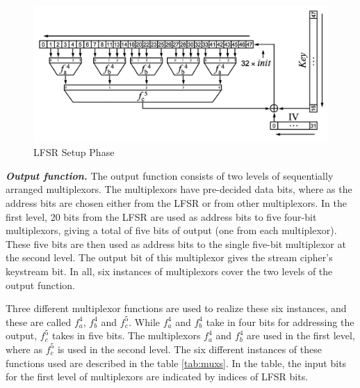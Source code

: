 
\begin{figure}[ht!]
	\centering
		\includegraphics[width=5in]{./figures/hitag2-2.PNG}
	\caption{LFSR Setup Phase}	
	\label{fig:hitag2-2}
\end{figure}

\textit{\textbf{Output function.}} The output function consists of two levels of sequentially arranged multiplexors. The multiplexors have pre-decided data bits, where as the address bits are chosen either from the LFSR or from other multiplexors. In the first level, 20 bits from the LFSR are used as address bits to five four-bit multiplexors, giving a total of five bits of output (one from each multiplexor). These five bits are then used as address bits to the single five-bit multiplexor at the second level. The output bit of this multiplexor gives the stream cipher's keystream bit. In all, six instances of multiplexors cover the two levels of the output function.

Three different multiplexor functions are used to realize these six instances, and these are called $f_a^4$, $f_b^4$ and $f_c^5$. While $f_a^4$ and $f_b^4$ take in four bits for addressing the output, $f_c^5$ takes in five bits. The multiplexors $f_a^4$ and $f_b^4$ are used in the first level, where as $f_c^5$ is used in the second level. The six different instances of these functions used are described in the table \ref{tab:muxs}. In the table, the input bits for the first level of multiplexors are indicated by indices of LFSR bits.

